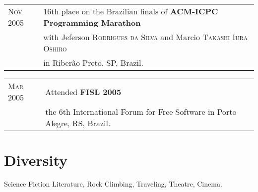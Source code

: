 \documentclass[letter,10pt]{article}
\begin{document}
\begin{tabular}{p{2.5cm}l}
  \textsc{Nov 2005} & 16th place on the Brazilian finals of \textbf{ACM-ICPC
    Programming Marathon}\\
  & with Jeferson \textsc{Rodrigues da Silva} and Marcio
  \textsc{Takashi Iura Oshiro}\\
  & in Riberão Preto, SP, Brazil.\\
\end{tabular}

\begin{tabular}{p{2.5cm}l}
  \textsc{Mar 2005} & Attended \textbf{FISL 2005}\\
  & the 6th International Forum for Free Software in Porto
  Alegre, RS, Brazil.\\
\end{tabular}

\section{Diversity}

Science Fiction Literature, Rock Climbing, Traveling,
Theatre, Cinema.
\end{document}
